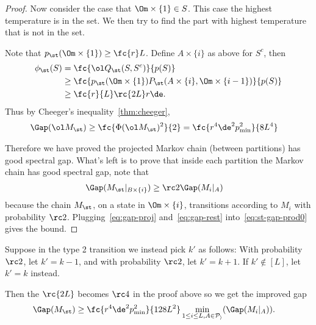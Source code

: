 \begin{proof}
Now consider the case that $\Om\times \{1\}\in S$. This case the highest temperature is in the set. We then try to find the part with highest temperature that is not in the set. 

Note that $p_{\st}(\Om\times \{1\}) \ge \fc{r}L$. Define $A\times \{i\}$ as above for $S^c$, then
\begin{align}
\phi_{\st}(S)&
=\fc{\ol Q_{\st}(S,S^c)}{p(S)}\\
&\ge \fc{p_{\st}(\Om\times \{1\}) P_{\st}(A\times \{i\}, \Om\times \{i-1\})}{p(S)}\\
&\ge \fc{r}{L} %
\rc{2L} r\de.
\end{align}
Thus by Cheeger's inequality~\ref{thm:cheeger},
\begin{align}
\Gap(\ol M_{\st}) &\ge \fc{\Phi(\ol M_{\st})^2}{2}
=\fc{r^4\de^2p_{\min}^2}{8L^4}
\label{eq:gap-proj}
\end{align}

Therefore we have proved the projected Markov chain (between partitions) has good spectral gap. What's left is to prove that inside each partition the Markov chain 
has good spectral gap, note that
\begin{align}
\Gap(M_{\st}|_{B\times \{i\}}) & \ge
\rc 2\Gap(M_i|_A)
\label{eq:gap-rest}
\end{align}
because the chain $M_{\st}$, on a state in $\Om\times \{i\}$, transitions according to $M_i$ with probability $\rc2$. 
Plugging~\eqref{eq:gap-proj} and~\eqref{eq:gap-rest} into~\eqref{eq:st-gap-prod0} gives the bound.
\end{proof}

\begin{rem}
Suppose in the type 2 transition we instead pick $k'$ as follows: With probability $\rc 2$, let $k'=k-1$, and with probability $\rc2$, let $k'=k+1$. If $k'\nin [L]$, let $k'=k$ instead.

Then the $\rc{2L}$ becomes $\rc4$ in the proof above so we get the improved gap
\begin{align}
\Gap(M_{\st}) &\ge\fc{r^4\de^2p_{\min}^2}{128L^2}
\min_{1\le i\le L, A\in \cal P_i} (\Gap(M_{i}|_A)).
\end{align}
\end{rem}




